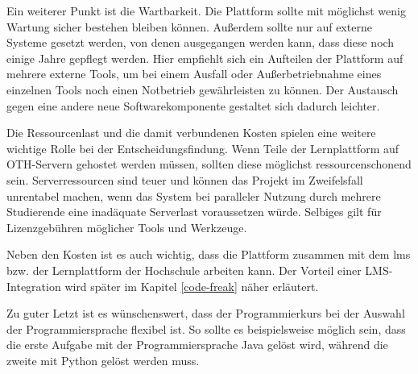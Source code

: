 Ein weiterer Punkt ist die Wartbarkeit. Die Plattform sollte mit möglichst wenig
Wartung sicher bestehen bleiben können. Außerdem sollte nur auf externe Systeme
gesetzt werden, von denen ausgegangen werden kann, dass diese noch einige Jahre
gepflegt werden. Hier empfiehlt sich ein Aufteilen der Plattform auf mehrere
externe Tools, um bei einem Ausfall oder Außerbetriebnahme eines einzelnen Tools
noch einen Notbetrieb gewährleisten zu können. Der Austausch gegen eine andere
neue Softwarekomponente gestaltet sich dadurch leichter.

Die Ressourcenlast und die damit verbundenen Kosten spielen eine weitere
wichtige Rolle bei der Entscheidungsfindung. Wenn Teile der Lernplattform auf
OTH-Servern gehostet werden müssen, sollten diese möglichst ressourcenschonend
sein. Serverressourcen sind teuer und können das Projekt im Zweifelsfall
unrentabel machen, wenn das System bei paralleler Nutzung durch mehrere
Studierende eine inadäquate Serverlast voraussetzen würde. Selbiges gilt für
Lizenzgebühren möglicher Tools und Werkzeuge.

Neben den Kosten ist es auch wichtig, dass die Plattform zusammen mit dem
\ac{lms} bzw. der Lernplattform der Hochschule arbeiten kann. Der Vorteil einer
LMS-Integration wird später im Kapitel \ref{code-freak} näher erläutert.

Zu guter Letzt ist es wünschenswert, dass der Programmierkurs bei der Auswahl
der Programmiersprache flexibel ist. So sollte es beispielsweise möglich sein,
dass die erste Aufgabe mit der Programmiersprache Java gelöst wird,
während die zweite mit Python gelöst werden muss.